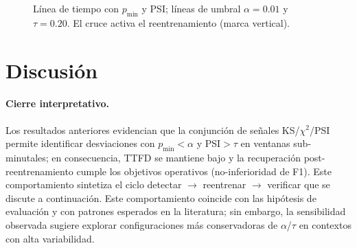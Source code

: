 \begin{figure}[htbp]
\centering
{}
\caption[Línea de tiempo con pmin y PSI]%
{Línea de tiempo con $p_{\min}$ y PSI; líneas de umbral $\alpha=0.01$ y $\tau=0.20$. El cruce activa el reentrenamiento (marca vertical).}
\label{fig:timeline-thresholds}
\end{figure}



\section{Discusión}
\paragraph{Cierre interpretativo.} Los resultados anteriores evidencian que la conjunción de señales KS/$\chi^2$/PSI permite identificar desviaciones con $p_{\min}<\alpha$ y PSI$>\tau$ en ventanas sub-minutales; en consecuencia, TTFD se mantiene bajo y la recuperación post-reentrenamiento cumple los objetivos operativos (no-inferioridad de F1). Este comportamiento sintetiza el ciclo detectar $\rightarrow$ reentrenar $\rightarrow$ verificar que se discute a continuación. Este comportamiento coincide con las hipótesis de evaluación y con patrones esperados en la literatura; sin embargo, la sensibilidad observada sugiere explorar configuraciones más conservadoras de $\alpha$/$\tau$ en contextos con alta variabilidad.
\label{subsec:eval-discussion}


